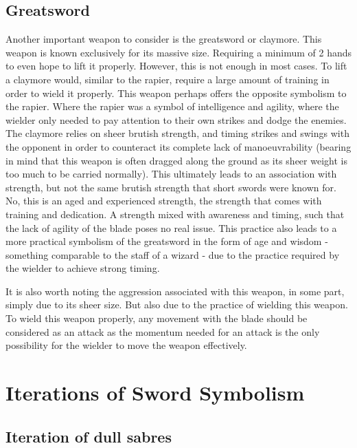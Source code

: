 \documentclass{article}
\begin{document}
\subsection{Greatsword} \label{greatswordSymbol}
Another important weapon to consider is the greatsword or claymore. This weapon is known exclusively for its massive size. Requiring a minimum of 2 hands to even hope to lift it properly. However, this is not enough in most cases. To lift a claymore would, similar to the rapier, require a large amount of training in order to wield it properly. This weapon perhaps offers the opposite symbolism to the rapier. Where the rapier was a symbol of intelligence and agility, where the wielder only needed to pay attention to their own strikes and dodge the enemies. The claymore relies on sheer brutish strength, and timing strikes and swings with the opponent in order to counteract its complete lack of manoeuvrability (bearing in mind that this weapon is often dragged along the ground as its sheer weight is too much to be carried normally). This ultimately leads to an association with strength, but not the same brutish strength that short swords were known for. No, this is an aged and experienced strength, the strength that comes with training and dedication. A strength mixed with awareness and timing, such that the lack of agility of the blade poses no real issue. This practice also leads to a more practical symbolism of the greatsword in the form of age and wisdom - something comparable to the staff of a wizard - due to the practice required by the wielder to achieve strong timing.

It is also worth noting the aggression associated with this weapon, in some part, simply due to its sheer size. But also due to the practice of wielding this weapon. To wield this weapon properly, any movement with the blade should be considered as an attack as the momentum needed for an attack is the only possibility for the wielder to move the weapon effectively.

\pagebreak

\section{Iterations of Sword Symbolism}

\subsection{Iteration of dull sabres} \label{Iteration1}
\end{document}
